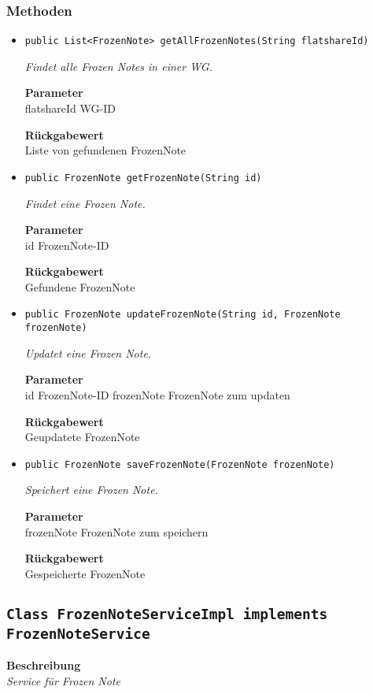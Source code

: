     \subsubsection{Methoden}
    \begin{itemize}
    	\item{\texttt{public List<FrozenNote> getAllFrozenNotes(String flatshareId)}}
    	
    	\textit{Findet alle Frozen Notes in einer WG.}
    	
    	\textbf{Parameter} \\
    	flatshareId WG-ID
    	
    	\textbf{Rückgabewert} \\
    	Liste von gefundenen FrozenNote        \item{\texttt{public FrozenNote getFrozenNote(String id)}}
    	
    	\textit{Findet eine Frozen Note.}
    	
    	\textbf{Parameter} \\
    	id FrozenNote-ID
    	
    	\textbf{Rückgabewert} \\
    	Gefundene FrozenNote        \item{\texttt{public FrozenNote updateFrozenNote(String id, FrozenNote frozenNote)}}
    	
    	\textit{Updatet eine Frozen Note.}
    	
    	\textbf{Parameter} \\
    	id FrozenNote-ID
    	frozenNote FrozenNote zum updaten
    	
    	\textbf{Rückgabewert} \\
    	Geupdatete FrozenNote        \item{\texttt{public FrozenNote saveFrozenNote(FrozenNote frozenNote)}}
    	
    	\textit{Speichert eine Frozen Note.}
    	
    	\textbf{Parameter} \\
    	frozenNote FrozenNote zum speichern
    	
    	\textbf{Rückgabewert} \\
    	Gespeicherte FrozenNote
    \end{itemize}
    \subsection{\texttt{Class FrozenNoteServiceImpl implements FrozenNoteService}}
    \textbf{Beschreibung} \\
    \textit{Service für Frozen Note}
